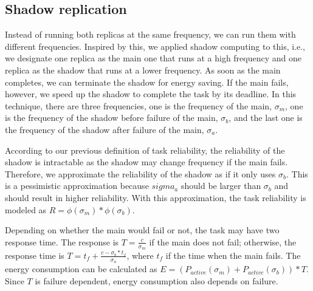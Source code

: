 \subsection{Shadow replication}
Instead of running both replicas at the same frequency, we can run them with different frequencies. Inspired by this, we applied shadow computing to this, i.e., we designate one replica as the main one that runs at a high frequency and one replica as the shadow that runs at a lower frequency. As soon as the main completes, we can terminate the shadow for energy saving. If the main fails, however, we speed up the shadow to complete the task by its deadline. In this technique, there are three frequencies, one is the frequency of the main, $\sigma_m$, one is the frequency of the shadow before failure of the main, $\sigma_b$, and the last one is the frequency of the shadow after failure of the main, $\sigma_a$. 

According to our previous definition of task reliability, the reliability of the shadow is intractable as the shadow may change frequency if the main fails. Therefore, we approximate the reliability of the shadow as if it only uses $\sigma_b$. This is a pessimistic approximation because $sigma_a$ should be larger than $\sigma_b$ and should result in higher reliability. With this approximation, the task reliability is modeled as $R = \phi(\sigma_m)*\phi(\sigma_b)$.

Depending on whether the main would fail or not, the task may have two response time. The response is $T=\frac{c}{\sigma_m}$ if the main does not fail; otherwise, the response time is $T=t_f + \frac{c - \sigma_b*t_f}{\sigma_a}$, where $t_f$ if the time when the main fails. The energy consumption can be calculated as $E = (P_{active}(\sigma_m) +P_{active}(\sigma_b))*T$. Since $T$ is failure dependent, energy consumption
also depends on failure.  

